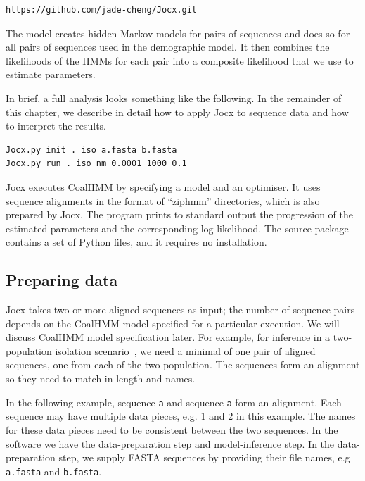 \documentclass[graybox]{svmult}
\begin{document}
 {\scriptsize{}\begin{verbatim}
https://github.com/jade-cheng/Jocx.git
\end{verbatim}}

The model creates hidden Markov models for pairs of sequences and does so for all pairs of sequences used in the demographic model. It then combines the likelihoods of the HMMs for each pair into a composite likelihood that we use to estimate parameters.

In brief, a full analysis looks something like the following.  In the remainder of this chapter, we describe in detail how to apply Jocx to sequence data and how to interpret the results.

 {\scriptsize{}\begin{verbatim}
Jocx.py init . iso a.fasta b.fasta
Jocx.py run . iso nm 0.0001 1000 0.1
\end{verbatim}}

Jocx executes CoalHMM by specifying a model and an optimiser. It uses sequence alignments in the format of ``ziphmm'' directories, which is also prepared by Jocx. The program prints to standard output the progression of the estimated parameters and the corresponding log likelihood. The source package contains a set of Python files, and it requires no installation.


\subsection{Preparing data}

Jocx takes two or more aligned sequences as input; the number of sequence pairs depends on the CoalHMM model specified for a particular execution. We will discuss CoalHMM model specification later. For example, for inference in a two-population isolation scenario~\cite{Mailund:2011dva}, we need a minimal of one pair of aligned sequences, one from each of the two population. The sequences form an alignment so they need to match in length and names.


In the following example, sequence \texttt{a} and sequence \texttt{a} form an alignment.  Each sequence may have multiple data pieces, e.g. 1 and 2 in this example.  The names for these data pieces need to be consistent between the two sequences.  In the software we have the data-preparation step and model-inference step.  In the data-preparation step, we supply FASTA sequences by providing their file names, e.g \texttt{a.fasta} and \texttt{b.fasta}.
\end{document}
